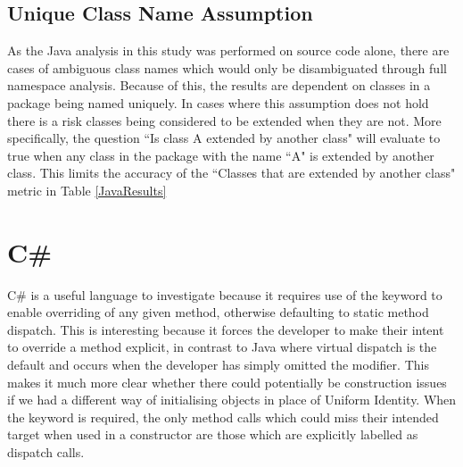 \subsection{Unique Class Name Assumption}
\label{uniqueNames}
As the Java analysis in this study was performed on source code alone, there are cases of ambiguous class names which would only be disambiguated through full namespace analysis. Because of this, the results are dependent on classes in a package being named uniquely. In cases where this assumption does not hold there is a risk classes being considered to be extended when they are not. More specifically, the question ``Is class A extended by another class" will evaluate to true when any class in the package with the name ``A" is extended by another class. This limits the accuracy of the ``Classes that are extended by another class" metric in Table \ref{JavaResults}

\section{C\#}
C\# is a useful language to investigate because it requires use of the  keyword to enable overriding of any given method, otherwise defaulting to static method dispatch. This is interesting because it forces the developer to make their intent to override a method explicit, in contrast to Java where virtual dispatch is the default and occurs when the developer has simply omitted the  modifier. This makes it much more clear whether there could potentially be construction issues if we had a different way of initialising objects in place of Uniform Identity. When the  keyword is required, the only method calls which could miss their intended target when used in a constructor are those which are explicitly labelled as  dispatch calls.

